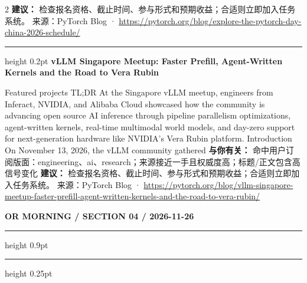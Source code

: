 \documentclass[10.5pt]{ctexart}
\begin{document}
\begin{multicols}{2}
\textbf{建议：} 检查报名资格、截止时间、参与形式和预期收益；合适则立即加入任务系统。
{\footnotesize\color{ormuted} 来源：PyTorch Blog · \url{https://pytorch.org/blog/explore-the-pytorch-day-china-2026-schedule/}}
\vspace{2mm}
\hrule height 0.2pt
\vspace{2mm}
{\large\bfseries vLLM Singapore Meetup: Faster Prefill, Agent-Written Kernels and the Road to Vera Rubin}\par
Featured projects TL;DR At the Singapore vLLM meetup, engineers from Inferact, NVIDIA, and Alibaba Cloud showcased how the community is advancing open source AI inference through pipeline parallelism optimizations, agent-written kernels, real-time multimodal world models, and day-zero support for next-generation hardware like NVIDIA’s Vera Rubin platform. Introduction On November 13, 2026, the vLLM community gathered
\textbf{与你有关：} 命中用户订阅版面：engineering、ai、research；来源接近一手且权威度高；标题/正文包含高信号变化
\textbf{建议：} 检查报名资格、截止时间、参与形式和预期收益；合适则立即加入任务系统。
{\footnotesize\color{ormuted} 来源：PyTorch Blog · \url{https://pytorch.org/blog/vllm-singapore-meetup-faster-prefill-agent-written-kernels-and-the-road-to-vera-rubin/}}
\end{multicols}
\newpage
{\small\bfseries OR MORNING / SECTION 04 / 2026-11-26}
\vspace{2mm}
\hrule height 0.9pt
\vspace{1.5mm}
\hrule height 0.25pt
\vspace{4mm}
\end{document}
